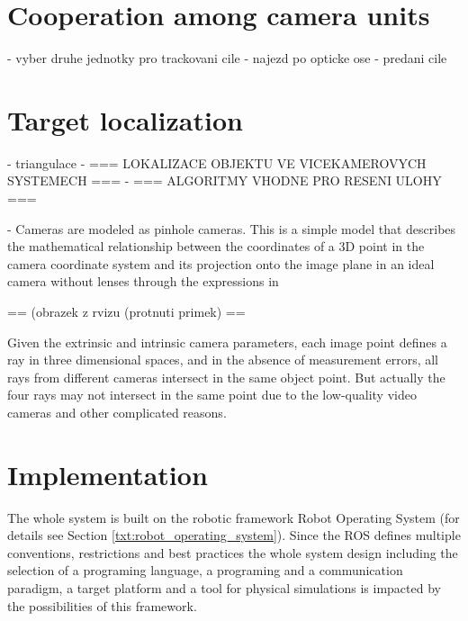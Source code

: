 \chapter{Cooperation among camera units}

- vyber druhe jednotky pro trackovani cile
- najezd po opticke ose
- predani cile


\chapter{Target localization} \label{txt:target_localization}

- triangulace
- === LOKALIZACE OBJEKTU VE VICEKAMEROVYCH SYSTEMECH ===
- === ALGORITMY VHODNE PRO RESENI ULOHY ===

- Cameras are modeled as pinhole cameras. This is a simple model that describes the mathematical
relationship between the coordinates of a 3D point in the camera coordinate system and its
projection onto the image plane in an ideal camera without lenses through the expressions in 

== (obrazek z rvizu (protnuti primek) ==

 Given  the  extrinsic  and  intrinsic  camera 
 parameters,  each  image  point  defines  a  ray  in  three 
 dimensional spaces, and in the absence of measurement errors, 
 all  rays  from  different  cameras  intersect  in  the  same  object 
 point. But actually the four rays may not intersect in the same 
 point  due  to  the  low-quality  video  cameras  and  other 
 complicated  reasons.
 


\chapter{Implementation} \label{txt:implementation}

The whole system is built on the robotic framework Robot Operating System (for details see Section \ref{txt:robot_operating_system}). Since the ROS defines multiple conventions, restrictions and best practices the whole system design including the selection of a programing language, a programing and a communication paradigm, a target platform and a tool for physical simulations is impacted by the possibilities of this framework.

